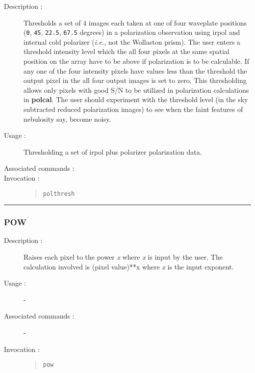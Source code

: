\begin{description}

\item[Description :] Thresholds a set of 4 images each taken at one of
four waveplate positions ({\tt 0}, {\tt 45}, {\tt 22.5}, {\tt 67.5}
degrees) in a polarization observation using {\sc irpol} and internal
cold polarizer (\emph{i.e.}, not the Wollaston prism).  The user enters
a threshold intensity level which the all four pixels at the same
spatial position on the array have to be above if polarization is to be
calculable.  If any one of the four intensity pixels have values less
than the threshold the output pixel in the all four output images is
set to zero.  This thresholding allows only pixels with good S/N to be
utilized in polarization calculations in {\bf polcal}. The user should
experiment with the threshold level (in the sky subtracted reduced
polarization images) to see when the faint features of nebulosity say,
become noisy.

\item[Usage :] Thresholding a set of {\sc irpol} plus polarizer
polarization data.
\item[Associated commands :] {\tt {}}
\item[Invocation :]

\begin{quote}{\tt  polthresh }\end{quote}

\end{description}

\hrule
\subsubsection*{\label{POW}POW}

\begin{description}

\item[Description :] Raises each pixel to the power {\it x} where {\it
x} is input by the user. The calculation involved is (pixel value)**x
where {\it x} is the input exponent.

\item[Usage :] -
\item[Associated commands :] -
\item[Invocation :]

\begin{quote}{\tt  pow }\end{quote}

\end{description}

